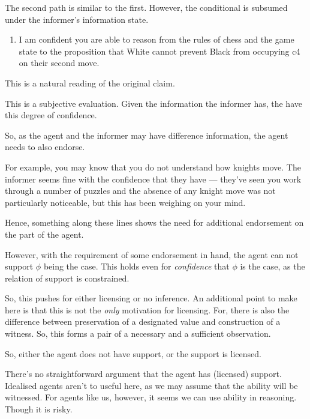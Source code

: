 \documentclass[10pt]{article}
\begin{document}
The second path is similar to the first.
However, the conditional is subsumed under the informer's information state.

\begin{enumerate}
\item\label{chess:claim:1:confidence} I am confident you are able to reason from the rules of chess and the game state to the proposition that White cannot prevent Black from occupying c4 on their second move.
\end{enumerate}

This is a natural reading of the original claim.

\begin{note}
  This is a subjective evaluation.
  Given the information the informer has, the have this degree of confidence.

  So, as the agent and the informer may have difference information, the agent needs to also endorse.

  For example, you may know that you do not understand how knights move.
  The informer seems fine with the confidence that they have --- they've seen you work through a number of puzzles and the absence of any knight move was not particularly noticeable, but this has been weighing on your mind.

  Hence, something along these lines shows the need for additional endorsement on the part of the agent.

  However, with the requirement of some endorsement in hand, the agent can not support \(\phi\) being the case.
  This holds even for \emph{confidence} that \(\phi\) is the case, as the relation of support is constrained.

  So, this pushes for either licensing or no inference.
  An additional point to make here is that this is not the \emph{only} motivation for licensing.
  For, there is also the difference between preservation of a designated value and construction of a witness.
  So, this forms a pair of a necessary and a sufficient observation.

  So, either the agent does not have support, or the support is licensed.

  There's no straightforward argument that the agent has (licensed) support.
  Idealised agents aren't to useful here, as we may assume that the ability will be witnessed.
  For agents like us, however, it seems we can use ability in reasoning.
  Though it is risky.
\end{note}
\end{document}
